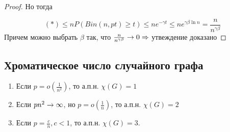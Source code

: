 \begin{proof}
    Но тогда 

    \[(*) \le nP(Bin(n, pt) \ge t) \le ne^{-\gamma t} \le ne^{\gamma \beta\ln n} = \frac{n}{n^{\gamma\beta}}\]
    Причем можно выбрать \(\beta\) так, что \(\frac{n}{n^{\gamma\beta}} \rightarrow 0 \Rightarrow\) утвеждение доказано
\end{proof}

\subsection{Хроматическое число случайного графа}
\begin{theorem}
    \begin{enumerate}
        \item Если \(p = o\left( \frac{1}{n^2} \right)\), то а.п.н. \(\chi(G) = 1\)
        \item Если \(pn^2 \rightarrow \infty\), но \(p = o\left( \frac{1}{n} \right)\), то а.п.н. \(\chi(G) = 2\)
        \item Если \(p = \frac{c}{n}, c < 1\), то а.п.н. \(\chi(G) = 3\).
    \end{enumerate}
\end{theorem}